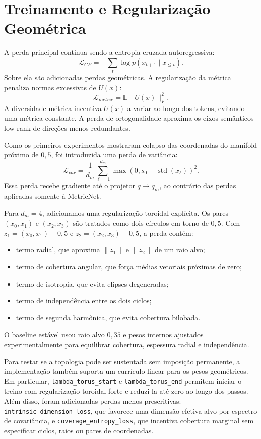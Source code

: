 \section{Treinamento e Regularização Geométrica}
\label{sec:treinamento}

A perda principal continua sendo a entropia cruzada autoregressiva:
\begin{equation}
  \mathcal{L}_{CE} = -\sum_t \log p(x_{t+1}\mid x_{\leq t}).
\end{equation}
Sobre ela são adicionadas perdas geométricas. A regularização da métrica
penaliza normas excessivas de $U(x)$:
\begin{equation}
  \mathcal{L}_{metric}=\mathbb{E}\|U(x)\|_F^2.
\end{equation}
A diversidade métrica incentiva $U(x)$ a variar ao longo dos tokens, evitando
uma métrica constante. A perda de ortogonalidade aproxima os eixos semânticos
low-rank de direções menos redundantes.

Como os primeiros experimentos mostraram colapso das coordenadas do manifold
próximo de $0{,}5$, foi introduzida uma perda de variância:
\begin{equation}
  \mathcal{L}_{var} =
  \frac{1}{d_m}\sum_{\ell=1}^{d_m}
  \max(0, s_0-\operatorname{std}(x_\ell))^2.
\end{equation}
Essa perda recebe gradiente até o projetor $q\rightarrow q_m$, ao contrário das
perdas aplicadas somente à MetricNet.

Para $d_m=4$, adicionamos uma regularização toroidal explícita. Os pares
$(x_0,x_1)$ e $(x_2,x_3)$ são tratados como dois círculos em torno de $0{,}5$.
Com $z_1=(x_0,x_1)-0{,}5$ e $z_2=(x_2,x_3)-0{,}5$, a perda contém:
\begin{itemize}
  \item termo radial, que aproxima $\|z_1\|$ e $\|z_2\|$ de um raio alvo;
  \item termo de cobertura angular, que força médias vetoriais próximas de
  zero;
  \item termo de isotropia, que evita elipses degeneradas;
  \item termo de independência entre os dois ciclos;
  \item termo de segunda harmônica, que evita cobertura bilobada.
\end{itemize}
O baseline estável usou raio alvo $0{,}35$ e pesos internos ajustados
experimentalmente para equilibrar cobertura, espessura radial e independência.

Para testar se a topologia pode ser sustentada sem imposição permanente, a
implementação também suporta um currículo linear para os pesos geométricos. Em
particular, \texttt{lambda\_torus\_start} e \texttt{lambda\_torus\_end}
permitem iniciar o treino com regularização toroidal forte e reduzi-la até zero
ao longo dos passos. Além disso, foram adicionadas perdas menos prescritivas:
\texttt{intrinsic\_dimension\_loss}, que favorece uma dimensão efetiva alvo
por espectro de covariância, e \texttt{coverage\_entropy\_loss}, que incentiva
cobertura marginal sem especificar ciclos, raios ou pares de coordenadas.

